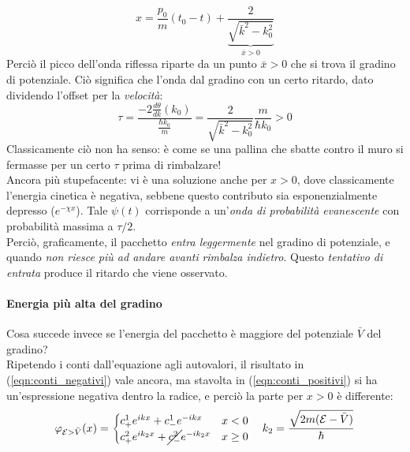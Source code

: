 \documentclass[../../FisicaTeorica.tex]{subfiles}
\begin{document}
\[
x= \frac{p_0}{m}(t_0-t) + \underbrace{\frac{2}{\sqrt{\bar{k}^2-k_0^2}}}_{\bar{x} > 0}
\]
Perciò il picco dell'onda riflessa riparte da un punto $\bar{x}>0$ che si trova  il gradino di potenziale. Ciò significa che l'onda  dal gradino con un certo ritardo, dato dividendo l'offset per la \textit{velocità}:
\[
\tau = \frac{\displaystyle -2\frac{d\theta}{dk}(k_0)}{
\displaystyle 
\frac{\hbar k_0}{m} 
}
=\frac{2}{\sqrt{\bar{k}^2-k_0^2}}\frac{m}{\hbar k_0} > 0
\]
Classicamente ciò non ha senso: è come se una pallina che sbatte contro il muro si fermasse per un certo $\tau$ prima di rimbalzare!\\
Ancora più stupefacente: vi è una soluzione anche per $x>0$, dove classicamente l'energia cinetica è negativa, sebbene questo contributo sia esponenzialmente depresso ($e^{-\chi x}$). Tale $\psi(t)$ corrisponde a un'\textit{onda di probabilità evanescente} con probabilità massima a $\tau/2$.\\ %
Perciò, graficamente, il pacchetto \textit{entra leggermente} nel gradino di potenziale, e quando \textit{non riesce più ad andare avanti} \textit{rimbalza indietro}. Questo \textit{tentativo di entrata} produce il ritardo che viene osservato.\\

\paragraph{Energia più alta del gradino} 
Cosa succede invece se l'energia del pacchetto è maggiore del potenziale $\bar{V}$ del gradino?\\
Ripetendo i conti dall'equazione agli autovalori, il risultato in (\ref{eqn:conti_negativi}) vale ancora, ma stavolta in (\ref{eqn:conti_positivi}) si ha un'espressione negativa dentro la radice, e perciò la parte per $x>0$ è differente:
\begin{equation}
\varphi_{\mathcal{E}>\bar{V}}(x)=\begin{cases}
c^1_+ e^{ikx}+c^1_- e^{-ikx} & x < 0\\
c^2_+ e^{ik_2 x} + \cancel{c^2_-}e^{-ik_2 x} & x\geq 0
\end{cases} \quad k_2=\frac{\sqrt{2m(\mathcal{E}-\bar{V})}}{\hbar}
\label{eqn:autofunzioni_energetiche}
\end{equation}
\end{document}
